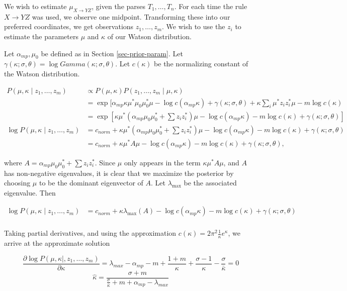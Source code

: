 We wish to estimate $\mu_{X\to YZ}$, given the parses $T_1, \dots,
T_n$. For each time the rule $X\to YZ$ was used, we observe one
midpoint. Transforming these into our preferred coordinates, we get
observations $z_1, \dots, z_m$. We wish to use the $z_i$ to estimate
the parameters $\mu$ and $\kappa$ of our Watson distribution.

Let $\alpha_{mp}, \mu_0$ be defined as in Section
\ref{sec-prior-param}. Let $\gamma(\kappa;\sigma,\theta) = \log
Gamma(\kappa; \sigma,\theta)$.  Let $c(\kappa)$ be the normalizing constant
of the Watson distribution.

\begin{align*}
P(\mu, \kappa \mid z_1,\dots,z_m) &\propto
P(\mu, \kappa) P(z_1,\dots,z_m\mid \mu, \kappa) \\
&= \exp[ \alpha_{mp}\kappa \mu^* \mu_0 \mu_0^* \mu
- \log c(\alpha_{mp} \kappa) + \gamma(\kappa; \sigma,\theta)
+ \kappa \sum_i \mu^* z_i z_i^* \mu - m \log c(\kappa)
\\
&= \exp[
\kappa \mu^* (\alpha_{mp} \mu_0 \mu_0^* + \sum z_i z_i^*)\mu
- \log c(\alpha_{mp} \kappa) - m \log c(\kappa) + 
\gamma(\kappa; \sigma, \theta) ]\\
\log P(\mu, \kappa \mid z_1,\dots,z_m) &= 
c_{norm} + 
\kappa \mu^* (\alpha_{mp} \mu_0 \mu_0^* + \sum z_i z_i^*)\mu
- \log c(\alpha_{mp} \kappa) - m \log c(\kappa) + 
\gamma(\kappa; \sigma, \theta) \\
&= c_{norm} + 
\kappa \mu^* A \mu
- \log c(\alpha_{mp} \kappa) - m \log c(\kappa) + 
\gamma(\kappa; \sigma, \theta),
\end{align*}

where $A = \alpha_{mp} \mu_0 \mu_0^* + \sum z_i z_i^*$.
Since $\mu$ only appears in the term $\kappa \mu^* A \mu$,
and $A$ has non-negative eigenvalues, it is clear
that we maximize the posterior by choosing $\mu$ to be
the dominant eigenvector of $A$.
Let $\lambda_{\max}$ be the associated eigenvalue. Then

\begin{align*}
\log P(\mu, \kappa \mid z_1,\dots,z_m) &= 
c_{norm} + \kappa \lambda_{\max}(A) - 
\log c(\alpha_{mp} \kappa) - m \log c(\kappa) + 
\gamma(\kappa; \sigma, \theta)\\
\end{align*}

Taking partial derivatives, and using the approximation
$c(\kappa) = 2 \pi^2 \frac{1}{\kappa} e^\kappa$,
we arrive at the approximate solution

$$
\frac{\partial \log P(\mu, \kappa \mid, z_1,\dots,z_m)}
{\partial \kappa} = 
\lambda_{max} - \alpha_{mp} -m + \frac{1+m}{\kappa} + 
\frac{\sigma-1}{\kappa} - \frac{\sigma}{\bar{\kappa}} = 0
$$
$$
\widehat{\kappa} = \frac{\sigma+m}{\frac{\sigma}{\bar{\kappa}}
+ m + \alpha_{mp} - \lambda_{max}}
$$


